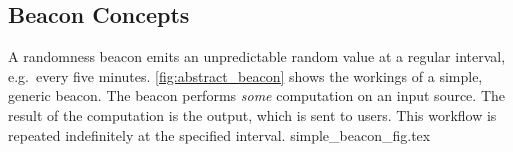 \begin{comment}
\mtjnote{Rewrite so that we describe a generic use case: Wanting randomness that several people can agree on, but they do not trust each other.}

It is useful to consider what type of users the beacon may be useful to. In general, the beacon can be by any type of multitude that desire to use transparent randomness \mtjnote{wat}.
The best fit for this is trustless applications where parties can be expected to cheat if it would benefit them.

A beacon is not needed for any single party, as they could simply generate their randomness themselves.
It is the need for multiple parties to agree on something random that creates the need for public randomness.

In addition, it is not needed for a setting with trust between the parties, as they could then simply trust each other to generate randomness.
In trust-less settings this is not an option, and so users need randomness they can trust not to be biased, or at least detect if it is.
This is where our beacon finds its niche of applications.
\end{comment}




\subsection{Beacon Concepts}

A randomness beacon emits an unpredictable random value at a regular interval, e.g.\ every five minutes. \cref{fig:abstract_beacon} shows the workings of a simple, generic beacon. The beacon performs \emph{some} computation on an input source. The result of the computation is the output, which is sent to users. This workflow is repeated indefinitely at the specified interval.
{simple_beacon_fig.tex}

